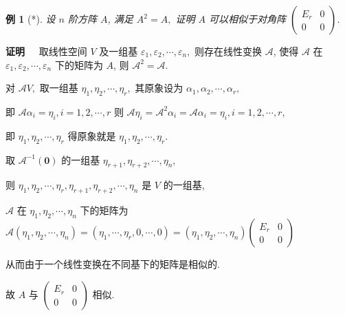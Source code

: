 \documentclass[13pt]{beamer}
\newtheorem{exa}{例}
\def\pf{{\bf 证明~~ }}
\def\A{\mathscr{A}}
\def\0{\mathbf{0}}
\begin{document}
\begin{frame}
\small{
\begin{exa}[*]
设 $n$ 阶方阵 $A$, 满足 $A^{2}=A,$ 证明 $A$ 可以相似于对角阵 $\left(\begin{array}{cc}E_{r} & 0 \\ 0 & 0\end{array}\right)$.
\end{exa}

\pf 取线性空间 $V$ 及一组基 $\varepsilon_{1}, \varepsilon_{2}, \cdots, \varepsilon_{n},$ 则存在线性变换 $\A$,
使得 $\A$ 在 $\varepsilon_{1}, \varepsilon_{2}, \cdots, \varepsilon_{n}$ 下的矩阵为
$A$,
则 $\A^{2}=\A$.

 对 $\A V,$ 取一组基 $\eta_{1}, \eta_{2}, \cdots, \eta_{r},$ 其原象设为 $\alpha_{1}, \alpha_{2}, \cdots, \alpha_{r},$ 
 
即 $\A \alpha_{i}=\eta_{i}, i=1,2, \cdots, r$
则 $\A \eta_{i}=\A^{2} \alpha_{i}=\A \alpha_{i}=\eta_{i}, i=1,2, \cdots, r,$ 

即 $\eta_{1}, \eta_{2}, \cdots, \eta_{r}$ 得原象就是 $\eta_{1}, \eta_{2}, \cdots, \eta_{r} .$ 

取 $\A ^{-1}(\0)$ 的一组基
$\eta_{r+1}, \eta_{r+2}, \cdots, \eta_{n},$ 

则 $\eta_{1}, \eta_{2}, \cdots, \eta_{r}, \eta_{r+1}, \eta_{r+2}, \cdots, \eta_{n}$ 是 $V$ 的一组基, 

$\A$ 在 $\eta_{1}, \eta_{2}, \cdots, \eta_{n}$ 下的矩阵为
$\A\left(\eta_{1}, \eta_{2}, \cdots, \eta_{n}\right)=\left(\eta_{1}, \cdots, \eta_{r}, 0, \cdots, 0\right)=\left(\eta_{1}, \eta_{2}, \cdots, \eta_{n}\right)\left(\begin{array}{cc}E_{r} & 0 \\ 0 & 0\end{array}\right)$

从而由于一个线性变换在不同基下的矩阵是相似的.

故 $A$ 与 $\left(\begin{array}{cc}E_{r} & 0 \\ 0 & 0\end{array}\right)$ 相似.
}
\end{frame}
\end{document}
